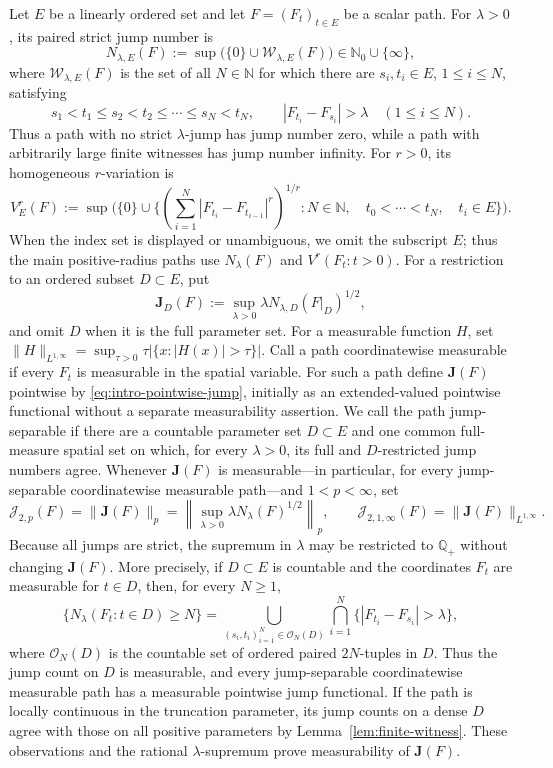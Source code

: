 \documentclass[11pt]{article}
\numberwithin{equation}{section}
\theoremstyle{remark}
\theoremstyle{definition}
\newcommand{\norm}[1]{\lVert #1\rVert}
\newcommand{\Jop}[1]{\mathcal J_{2,#1}}
\begin{document}
Let $E$ be a linearly ordered set and let $F=(F_t)_{t\in E}$ be a scalar
path.  For $\lambda>0$, its paired strict jump number is
\[
N_{\lambda,E}(F):=
 \sup\bigl(\{0\}\cup\mathcal W_{\lambda,E}(F)\bigr)
 \in\mathbb N_0\cup\{\infty\},
\]
where $\mathcal W_{\lambda,E}(F)$ is the set of all $N\in\mathbb N$ for
which there are $s_i,t_i\in E$, $1\le i\le N$, satisfying
\[
 s_1<t_1\le s_2<t_2\le\cdots\le s_N<t_N,
 \qquad |F_{t_i}-F_{s_i}|>\lambda\quad(1\le i\le N).
\]
Thus a path with no strict $\lambda$-jump has jump number zero, while a path
with arbitrarily large finite witnesses has jump number infinity.
For $r>0$, its homogeneous $r$-variation is
\[
V_E^r(F):=\sup\Biggl(\{0\}\cup
 \Biggl\{\left(\sum_{i=1}^N|F_{t_i}-F_{t_{i-1}}|^r\right)^{1/r}:
 N\in\mathbb N,\quad t_0<\cdots<t_N,\quad t_i\in E\Biggr\}\Biggr).
\]
When the index set is displayed or unambiguous, we omit the subscript $E$;
thus the main positive-radius paths use $N_\lambda(F)$ and
$V^r(F_t:t>0)$.  For a restriction to an ordered subset $D\subset E$, put
\[
 \mathbf J_D(F):=\sup_{\lambda>0}\lambda
 N_{\lambda,D}(F|_D)^{1/2},
\]
and omit $D$ when it is the full parameter set.
For a measurable function $H$, set
$\norm H_{L^{1,\infty}}=\sup_{\tau>0}\tau|\{x:|H(x)|>\tau\}|$.
Call a path coordinatewise measurable if every $F_t$ is measurable in the
spatial variable.  For such a path define $\mathbf J(F)$ pointwise by
\eqref{eq:intro-pointwise-jump}, initially as an extended-valued pointwise
functional without a separate measurability assertion.  We call the path
jump-separable if there are a countable parameter set $D\subset E$ and one common
full-measure spatial set on which, for every $\lambda>0$, its full and
$D$-restricted jump numbers agree.
Whenever $\mathbf J(F)$ is measurable---in particular, for every
jump-separable coordinatewise measurable path---and $1<p<\infty$, set
\begin{equation}\label{eq:inside-jump-norms}
 \Jop{p}(F)=\norm{\mathbf J(F)}_p
 =\left\|\sup_{\lambda>0}
 \lambda N_\lambda(F)^{1/2}\right\|_p,
 \qquad
 \Jop{1,\infty}(F)=\norm{\mathbf J(F)}_{L^{1,\infty}}.
\end{equation}
Because all jumps are strict, the supremum in $\lambda$ may be restricted
to $\mathbb Q_+$ without changing $\mathbf J(F)$.  More precisely, if
$D\subset E$ is countable and the coordinates $F_t$ are measurable
for $t\in D$, then, for every $N\ge1$,
\[
 \{N_\lambda(F_t:t\in D)\ge N\}
 =\bigcup_{(s_i,t_i)_{i=1}^N\in\mathcal O_N(D)}
   \bigcap_{i=1}^N\{|F_{t_i}-F_{s_i}|>\lambda\},
\]
where $\mathcal O_N(D)$ is the countable set of ordered paired
$2N$-tuples in $D$.  Thus the jump count on $D$ is measurable, and every
jump-separable coordinatewise measurable path has a measurable pointwise
jump functional.  If the
path is locally continuous in the truncation parameter, its jump counts on
a dense $D$ agree with those on all positive parameters by
Lemma~\ref{lem:finite-witness}.  These observations and the rational
$\lambda$-supremum prove measurability of $\mathbf J(F)$.
\end{document}
